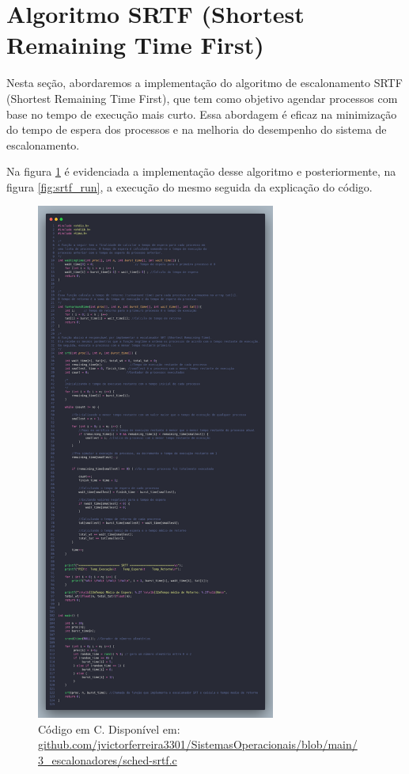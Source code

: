 \documentclass[
	12pt,				%
	openright,			%
	oneside,			%
	a4paper,			%
	chapter=TITLE,		%
	english,			%
	french,				%
	spanish,			%
	brazil				%
	]{abntex2}
\theoremstyle{definition}
\begin{document}

\section{Algoritmo SRTF (Shortest Remaining Time First)}
Nesta seção, abordaremos a implementação do algoritmo de escalonamento SRTF 
(Shortest Remaining Time First), que tem como objetivo agendar processos com base no tempo 
de execução mais curto. Essa abordagem é eficaz na minimização do tempo de espera 
dos processos e na melhoria do desempenho do sistema de escalonamento. 

Na figura \ref{fig:srtf} é evidenciada a implementação desse algoritmo e posteriormente, na figura \ref{fig:srtf_run},
a execução do mesmo seguida da explicação do código.

\begin{figure}[H]
    \centering
    \includegraphics[width=0.7\textwidth]{imagens/srtf_src.png}
    \caption{Código em C. Disponível em: \href{https://github.com/jvictorferreira3301/Sistemas_Operacionais/blob/main/3_escalonadores/sched-srtf.c}{github.com/jvictorferreira3301/SistemasOperacionais/blob/main/
    3\_escalonadores/sched-srtf.c}}
    \label{fig:srtf}
\end{figure}
\end{document}
